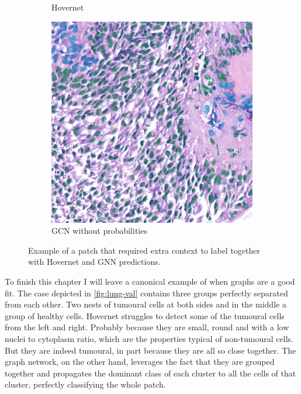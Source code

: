 \begin{figure}[H]
\begin{subfigure}[b]{0.3\textwidth}
    \caption{Hovernet}
  \end{subfigure}
  \begin{subfigure}[b]{0.3\textwidth}
    \includegraphics[width=\textwidth]{imgs/qual/lung/context-no-prior.png}
    \caption{GCN without probabilities}
  \end{subfigure}
    \caption{Example of a patch that required extra context to label together with Hovernet and GNN predictions.}
    \label{fig:lung-context}
\end{figure}
\newpage
To finish this chapter I will leave a canonical example of when graphs are a good fit. The case depicted in \autoref{fig:lung-val} contains three groups perfectly separated from each other. Two nests of tumoural cells at both sides and in the middle a group of healthy cells. Hovernet struggles to detect some of the tumoural cells from the left and right. Probably because they are small, round and with a low nuclei to cytoplasm ratio, which are the properties typical of non-tumoural cells. But they are indeed tumoural, in part because they are all so close together. The graph network, on the other hand, leverages the fact that they are grouped together and propagates the dominant class of each cluster to all the cells of that cluster, perfectly classifying the whole patch.

